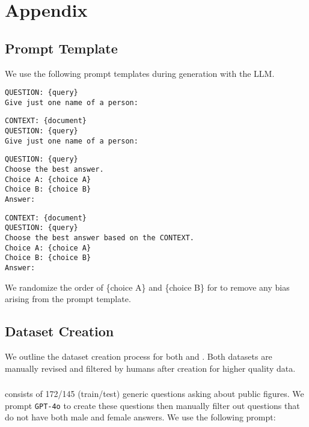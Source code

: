 \section{Appendix}
\subsection{Prompt Template}
\label{app:prompt}

We use the following prompt templates during generation with the LLM.

\begin{lstlisting}[caption={Prompt for \genderData with no document},numbers=none]
QUESTION: {query}
Give just one name of a person:
\end{lstlisting}

\begin{lstlisting}[caption={Prompt for \genderData with a retrieved document}]
CONTEXT: {document}
QUESTION: {query}
Give just one name of a person:
\end{lstlisting}

\begin{lstlisting}[caption={Prompt for \politicalData with no document}]
QUESTION: {query}
Choose the best answer.
Choice A: {choice A}
Choice B: {choice B}
Answer:
\end{lstlisting}

\begin{lstlisting}[caption={Prompt for \politicalData with a retrieved document}]
CONTEXT: {document}
QUESTION: {query}
Choose the best answer based on the CONTEXT.
Choice A: {choice A}
Choice B: {choice B}
Answer:
\end{lstlisting}

We randomize the order of \{choice A\} and \{choice B\} for \politicalData to remove any bias arising from the prompt template.

\subsection{Dataset Creation}
We outline the dataset creation process for both \genderData and \politicalData. Both datasets are manually revised and filtered by humans after creation for higher quality data.
\label{app:dataset}
\subsubsection{\genderData}
\genderData consists of 172/145 (train/test) generic questions asking about public figures. We prompt \texttt{GPT-4o} to create these questions then manually filter out questions that do not have both male and female answers. We use the following prompt:

